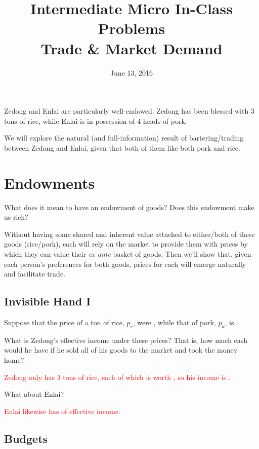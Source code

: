 \documentclass{article}
\begin{document}
\title{Intermediate Micro In-Class Problems \\ \large Trade \& Market Demand}

\date{June 13, 2016}

\maketitle

Zedong and Enlai are particularly well-endowed. Zedong has been blessed with 3 tons of rice, while Enlai is in possession of 4 heads of pork.

We will explore the natural (and full-information) result of bartering/trading between Zedong and Enlai, given that both of them like both pork and rice.

\section{Endowments}

What does it mean to have an endowment of goods? Does this endowment make us rich?

Without having some shared and inherent value attached to either/both of these goods (rice/pork), each will rely on the market to provide them with prices by which they can value their \textit{ex ante} basket of goods. Then we'll show that, given each person's preferences for both goods, prices for each will emerge naturally and facilitate trade.

\subsection{Invisible Hand I}

Suppose that the price of a ton of rice, $p_r$, were , while that of pork, $p_k$, is .

What is Zedong's effective income under these prices? That is, how much cash would he have if he sold all of his goods to the market and took the money home?

\textcolor{red}{Zedong only has 3 tons of rice, each of which is worth , so his income is .}  

What about Enlai?

\textcolor{red}{Enlai likewise has  of effective income.} 

\subsection{Budgets}
\end{document}
